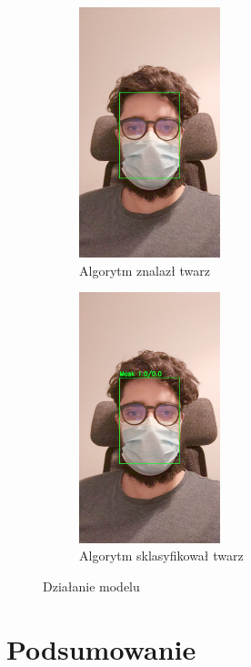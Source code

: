 \documentclass[12pt]{article}
\begin{document}
		\begin{figure}
			\centering
			\begin{subfigure}[b]{0.49\textwidth}
				\centering
				\includegraphics[width=0.45\textwidth]{twarz.jpeg}
				\caption{Algorytm znalazł twarz}
				\label{fig:twarz}
			\end{subfigure}
			\hfil
			\begin{subfigure}[b]{0.49\textwidth}
				\centering
				\includegraphics[width=0.45\textwidth]{maska.jpeg}
				\caption{Algorytm sklasyfikował twarz}
				\label{fig:maska}
			\end{subfigure}
			\caption{Działanie modelu}
		\end{figure}
	\section{Podsumowanie}
	
\end{document}
